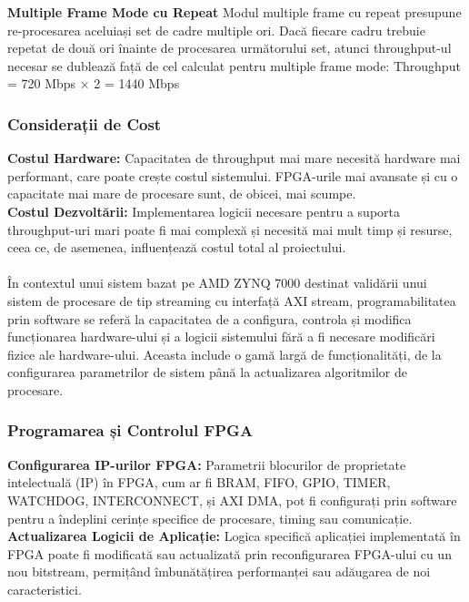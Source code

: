 \documentclass[12pt]{article}
\begin{document}
\textbf{Multiple Frame Mode cu Repeat}
Modul multiple frame cu repeat presupune re-procesarea aceluiași set de cadre multiple ori. Dacă fiecare cadru trebuie repetat de două ori înainte de procesarea următorului set, atunci throughput-ul necesar se dublează față de cel calculat pentru multiple frame mode:
Throughput = 720 Mbps × 2 = 1440 Mbps

\subsubsection{Considerații de Cost}
\textbf{Costul Hardware:} Capacitatea de throughput mai mare necesită hardware mai performant, care poate crește costul sistemului. FPGA-urile mai avansate și cu o capacitate mai mare de procesare sunt, de obicei, mai scumpe.\\
\textbf{Costul Dezvoltării:} Implementarea logicii necesare pentru a suporta throughput-uri mari poate fi mai complexă și necesită mai mult timp și resurse, ceea ce, de asemenea, influențează costul total al proiectului.\\\\
În contextul unui sistem bazat pe AMD ZYNQ 7000 destinat validării unui sistem de procesare de tip streaming cu interfață AXI stream, programabilitatea prin software se referă la capacitatea de a configura, controla și modifica funcționarea hardware-ului și a logicii sistemului fără a fi necesare modificări fizice ale hardware-ului. Aceasta include o gamă largă de funcționalități, de la configurarea parametrilor de sistem până la actualizarea algoritmilor de procesare.

\subsubsection{Programarea și Controlul FPGA}
\textbf{Configurarea IP-urilor FPGA:} Parametrii blocurilor de proprietate intelectuală (IP) în FPGA, cum ar fi BRAM, FIFO, GPIO, TIMER, WATCHDOG, INTERCONNECT, și AXI DMA, pot fi configurați prin software pentru a îndeplini cerințe specifice de procesare, timing sau comunicație.\\
\textbf{Actualizarea Logicii de Aplicație:} Logica specifică aplicației implementată în FPGA poate fi modificată sau actualizată prin reconfigurarea FPGA-ului cu un nou bitstream, permițând îmbunătățirea performanței sau adăugarea de noi caracteristici.\\\\\\\\
\end{document}
